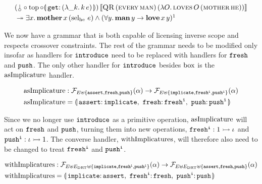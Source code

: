 \begin{align*}
  &\ap{(\cherry \circ \TOP \circ \banana{\onto{\op{get}}{(\lam{\_ k}{\ap{k}{e}})}})}{\sem{\app{\abs{QR}}{(\ap{\abs{every}}{\abs{man}})}{(\lam{O}{\app{\abs{loves}}{O}{(\ap{\abs{mother}}{\abs{he}})}})}}} \\
  &\tto \exists x.\, \app{\obj{mother}}{x}{(\ap{\selhe}{e})} \land (\forall y.\, \ap{\obj{man}}{y} \to \app{\obj{love}}{x}{y})\footnotemark
\end{align*}

We now have a grammar that is both capable of licensing inverse scope and
respects crossover constraints. The rest of the grammar needs to be
modified only insofar as handlers for $\mathtt{introduce}$ need to be replaced
with handlers for $\mathtt{fresh}$ and $\mathtt{push}$. The only other handler for
$\mathtt{introduce}$ besides $\mathrm{box}$ is the $\operatorname{asImplicature}$ handler.

\begin{align*}
  \asImplicature &: \FF_{E \uplus \{\op{assert},\op{fresh},\op{push}\}}(\alpha) \to
                    \FF_{E \uplus \{\op{implicate},\op{fresh^i},\op{push^i}\}}(\alpha) \\
  \asImplicature &= \banana{\onto{\op{assert}}{\op{implicate}},\
                            \onto{\op{fresh}}{\op{fresh^i}},\
                            \onto{\op{push}}{\op{push^i}}}
\end{align*}

Since we no longer use $\mathtt{introduce}$ as a primitive operation,
$\operatorname{asImplicature}$ will act on $\mathtt{fresh}$ and $\mathtt{push}$, turning them
into new operations, $\mathtt{fresh^i} : 1 \rightarrowtail \iota$ and
$\mathtt{push^i} : \iota \rightarrowtail 1$. The converse handler, $\operatorname{withImplicatures}$,
will therefore also need to be changed to treat $\mathtt{fresh^i}$ and
$\mathtt{push^i}$.

\begin{align*}
  \withImplicatures &: \FF_{E \uplus E_\DRT \uplus \{\op{implicate},\op{fresh^i},\op{push^i}\}}(\alpha) \to
                       \FF_{E \uplus E_\DRT \uplus \{\op{assert},\op{fresh},\op{push}\}}(\alpha) \\
  \withImplicatures &= \banana{\onto{\op{implicate}}{\op{assert}},\
                               \onto{\op{fresh^i}}{\op{fresh}},\
                               \onto{\op{push^i}}{\op{push}}}
\end{align*}


